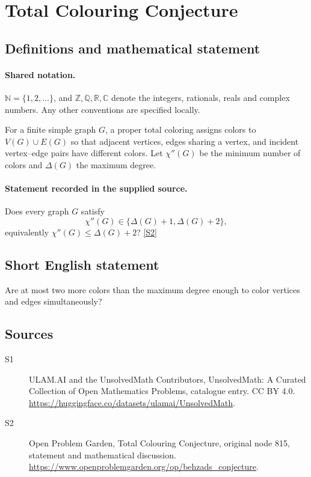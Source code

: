 \documentclass[11pt]{article}
\newcommand{\sref}[2]{\hyperlink{source:#1:#2}{[S#2]}}
\begin{document}
\section{Total Colouring Conjecture}\label{statement}

\subsection{Definitions and mathematical statement}

\paragraph{Shared notation.}$\mathbb N=\{1,2,\ldots\}$, and $\mathbb Z,\mathbb Q,\mathbb R,\mathbb C$ denote the integers, rationals, reals and complex numbers. Any other conventions are specified locally.


For a finite simple graph $G$, a proper total coloring assigns colors to $V(G)\cup E(G)$ so that adjacent vertices, edges sharing a vertex, and incident vertex--edge pairs have different colors. Let $\chi''(G)$ be the minimum number of colors and $\Delta(G)$ the maximum degree.
\paragraph{Statement recorded in the supplied source.}
Does every graph $G$ satisfy \[\chi''(G)\in\{\Delta(G)+1,\Delta(G)+2\},\] equivalently $\chi''(G)\le\Delta(G)+2$? \sref{statement}{2}
\subsection{Short English statement}
Are at most two more colors than the maximum degree enough to color vertices and edges simultaneously?
\subsection{Sources}
\begin{description}
\item[\hypertarget{source:statement:1}{S1}] ULAM.AI and the UnsolvedMath Contributors, UnsolvedMath: A Curated Collection of Open Mathematics Problems, catalogue entry. CC BY 4.0. \url{https://huggingface.co/datasets/ulamai/UnsolvedMath}.
\item[\hypertarget{source:statement:2}{S2}] Open Problem Garden, Total Colouring Conjecture, original node 815, statement and mathematical discussion. \url{https://www.openproblemgarden.org/op/behzads_conjecture}.
\end{description}
\label{end:statement}
\end{document}
